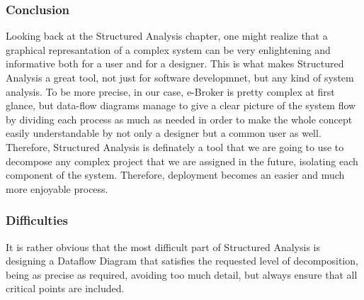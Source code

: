 \documentclass{article}
\begin{document}
\subsubsection{Conclusion}
Looking back at the Structured Analysis chapter, one might realize that
a graphical represantation of a complex system can be very enlightening and informative both for
a user and for a designer. This is what makes Structured Analysis a great tool, not just for software developmnet, but any
kind of system analysis. To be more precise, in our case, e-Broker is pretty complex at first glance,
but data-flow diagrams manage
to give a clear picture of the system flow by dividing each process as much as needed in order to make the whole concept
easily understandable by not only a designer but a common user as well. Therefore, Structured Analysis is definately a tool
that we are going to use to decompose any complex project that we are assigned in the future, isolating each component of
the system. Therefore, deployment becomes an easier and much more enjoyable process.

\subsubsection{Difficulties}
It is rather obvious that the most difficult part of Structured Analysis is designing
a Dataflow Diagram that satisfies the requested level of decomposition, being as precise as required, avoiding
too much detail, but always ensure that all critical points are included.  
\end{document}
